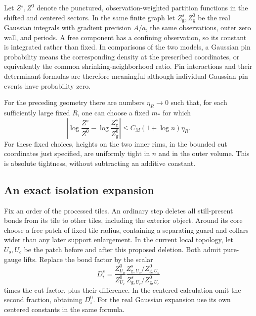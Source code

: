 

Let \(Z^s,Z^0\) denote the punctured, observation-weighted partition
functions in the shifted and centered sectors. In the same finite
graph let \(Z_{\mathrm g}^s,Z_{\mathrm g}^0\) be the real Gaussian
integrals with gradient precision \(A/a\), the same observations,
outer zero wall, and periods. A free component has a confining
observation, so its constant is integrated rather than fixed.
In comparisons of the two models, a Gaussian pin probability
means the corresponding density at the prescribed coordinates,
or equivalently the common shrinking-neighborhood ratio.
Pin interactions and their determinant formulas are therefore
meaningful although individual Gaussian pin events have
probability zero.

\begin{proposition}
\label{prop:sector-comparison}
For the preceding geometry there are numbers \(\eta_R\to0\) such that,
for each sufficiently large fixed \(R\), one can choose a fixed
\(m_*\) for which
\begin{equation}\label{eq:magnetic-sector-comparison}
 \left|\log\frac{Z^s}{Z^0}
       -\log\frac{Z_{\mathrm g}^s}{Z_{\mathrm g}^0}\right|
       \le C_M(1+\log n)\eta_R.
\end{equation}
For these fixed choices, heights on the two inner rims, in the
bounded cut coordinates just specified, are uniformly tight in
\(n\) and in the outer volume. This is absolute tightness, without
subtracting an additive constant.
\end{proposition}

\subsection{An exact isolation expansion}

Fix an order of the processed tiles. An ordinary step deletes all
still-present bonds from its tile to other tiles, including the
exterior object. Around its core choose a free patch of fixed tile
radius, containing a separating guard and collars wider than any
later support enlargement. In the current local topology, let
\(U_o,U_c\) be the patch before and after this proposed deletion.
Both admit pure-gauge lifts. Replace the bond factor by the scalar
\begin{equation}\label{eq:magnetic-proxy}
 D_i^s=
 \frac{Z_{U_o}^0}{Z_{U_c}^0}
 \frac{Z_{\mathrm g,U_o}^s/Z_{\mathrm g,U_o}^0}
      {Z_{\mathrm g,U_c}^s/Z_{\mathrm g,U_c}^0}
\end{equation}
times the cut factor, plus their difference. In the centered
calculation omit the second fraction, obtaining \(D_i^0\).
For the real Gaussian expansion use its own centered constants
in the same formula.

